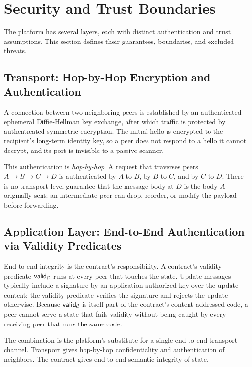 \section{Security and Trust Boundaries}
\label{sec:trust}

The platform has several layers, each with distinct authentication and trust assumptions. This section defines their guarantees, boundaries, and excluded threats.

\subsection{Transport: Hop-by-Hop Encryption and Authentication}

A connection between two neighboring peers is established by an authenticated ephemeral Diffie-Hellman key exchange, after which traffic is protected by authenticated symmetric encryption. The initial hello is encrypted to the recipient's long-term identity key, so a peer does not respond to a hello it cannot decrypt, and its port is invisible to a passive scanner.

This authentication is \emph{hop-by-hop}. A request that traverses peers $A \to B \to C \to D$ is authenticated by $A$ to $B$, by $B$ to $C$, and by $C$ to $D$. There is no transport-level guarantee that the message body at $D$ is the body $A$ originally sent: an intermediate peer can drop, reorder, or modify the payload before forwarding.

\subsection{Application Layer: End-to-End Authentication via Validity Predicates}

End-to-end integrity is the contract's responsibility. A contract's validity predicate $\mathsf{valid}_{\mathcal{C}}$ runs at every peer that touches the state. Update messages typically include a signature by an application-authorized key over the update content; the validity predicate verifies the signature and rejects the update otherwise. Because $\mathsf{valid}_{\mathcal{C}}$ is itself part of the contract's content-addressed code, a peer cannot serve a state that fails validity without being caught by every receiving peer that runs the same code.

The combination is the platform's substitute for a single end-to-end transport channel. Transport gives hop-by-hop confidentiality and authentication of neighbors. The contract gives end-to-end semantic integrity of state.

